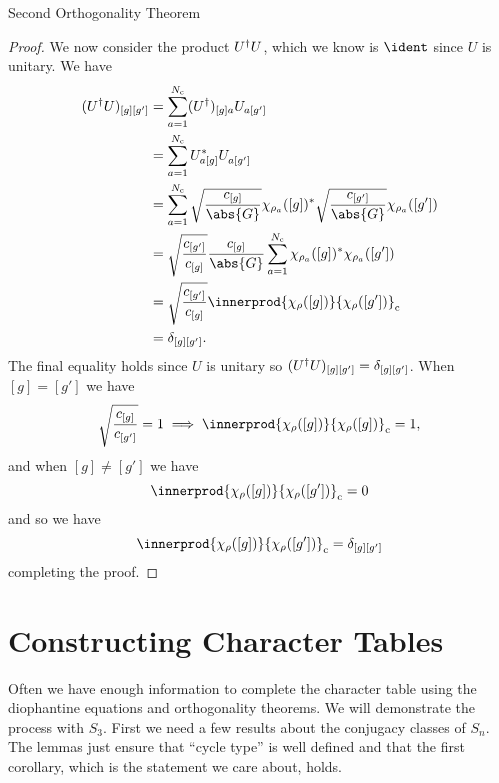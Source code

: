 \begin{thm}{Second Orthogonality Theorem}{}
\begin{proof}
        We now consider the product \(U^\dagger U\), which we know is
        \(\ident\) since \(U\) is unitary.
        We have
        \begingroup
        \allowdisplaybreaks
        \begin{align}
            (U^\hermit U)_{[g][g']} &= \sum_{a = 1}^{N_{\mathrm{c}}}
            (U^\hermit)_{[g]a}U_{a[g']}\\
            &= \sum_{a = 1}^{N_{\mathrm{c}}}
            U_{a[g]}^*U_{a[g']}^{\phantom{*}}\\
            &= \sum_{a = 1}^{N_{\mathrm{c}}} \sqrt{\frac{c_{[g]}}{\abs{G}}}
            \chi_{\rho_a}([g])^* \sqrt{\frac{c_{[g']}}{\abs{G}}} \chi_{\rho_a}([g'])\\
            &= \sqrt{\frac{c_{[g']}}{c_{[g]}}} \frac{c_{[g]}}{\abs{G}}
            \sum_{a = 1}^{N_{\mathrm{c}}}  \chi_{\rho_a}([g])^* \chi_{\rho_a}([g'])\\
            &= \sqrt{\frac{c_{[g']}}{c_{[g]}}}
            \innerprod{\chi_{\rho}([g])}{\chi_{\rho}([g'])}_{\mathrm{c}}\\
            &= \delta_{[g][g']}.
        \end{align}
        \endgroup
        The final equality holds since \(U\) is unitary so \((U^\dagger
        U)_{[g][g']} = \delta_{[g][g']}\).
        When \([g] = [g']\) we have
        \begin{equation}
            \sqrt{\frac{c_{[g]}}{c_{[g']}}} = 1 \implies
            \innerprod{\chi_{\rho}([g])}{\chi_{\rho}([g])}_{\mathrm{c}} = 1,
        \end{equation}
        and when \([g] \ne [g']\) we have
        \begin{equation}
            \innerprod{\chi_{\rho}([g])}{\chi_{\rho}([g'])}_{\mathrm{c}} = 0
        \end{equation}
        and so we have
        \begin{equation}
            \innerprod{\chi_{\rho}([g])}{\chi_{\rho}([g'])}_{\mathrm{c}} =
            \delta_{[g][g']}
        \end{equation}
        completing the proof.
    \end{proof}
\end{thm}

\section{Constructing Character Tables}
Often we have enough information to complete the character table using the
diophantine equations and orthogonality theorems.
We will demonstrate the process with \(S_3\).
First we need a few results about the conjugacy classes of \(S_n\).
The lemmas just ensure that \enquote{cycle type} is well defined and that
the first corollary, which is the statement we care about, holds.

